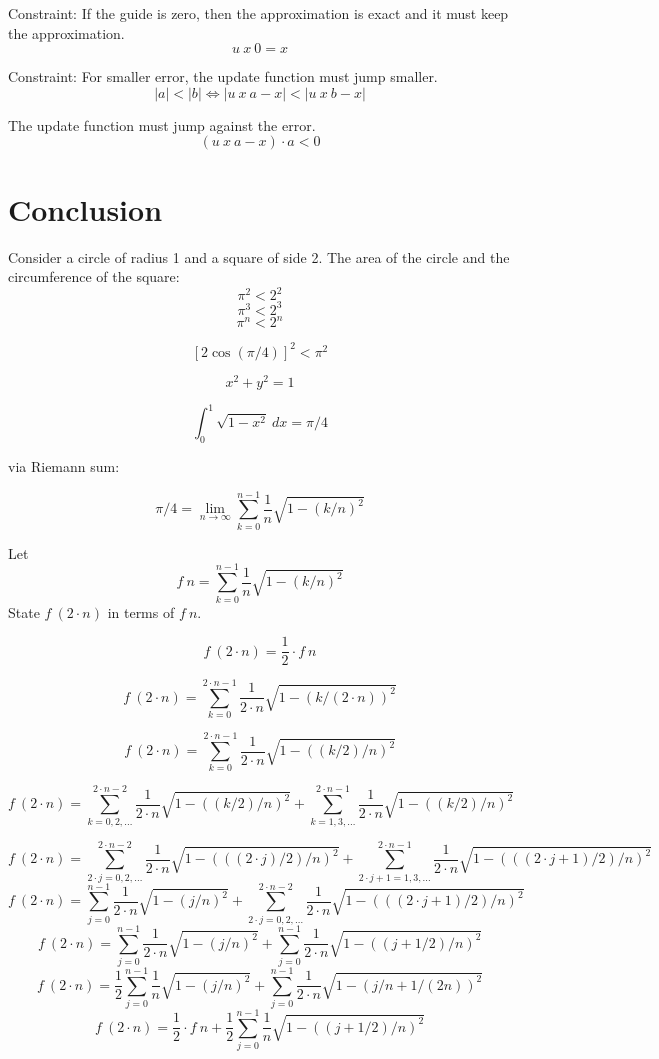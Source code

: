 Constraint: If the guide is zero, then the approximation is exact
and it must keep the approximation.
\[
    u~x~0 = x
\]

Constraint: For smaller error, the update function must jump smaller.
\[
    |a| < |b| \iff |u~x~a - x| < |u~x~b - x|
\]

The update function must jump against the error.
\[
    (u~x~a - x) \cdot a < 0
\]

\section{Conclusion}

Consider a circle of radius 1 and a square of side 2.
The area of the circle and the circumference of the square:
\[
    \pi^2 < 2^2
\]
\[
    \pi^3 < 2^3
\]
\[
    \pi^n < 2^n
\]

\[
    [2 \cos (\pi/4)]^2 < \pi^2
\]

\[
    x^2 + y^2 = 1
\]

\[
    \int_0^1 \sqrt{1-x^2}~dx = \pi / 4
\]

via Riemann sum:

\[
    \pi/4 = \lim_{n\to\infty} \sum_{k=0}^{n-1} \frac{1}{n} \sqrt{1 - (k/n)^2}
\]

Let
\[
    f~n = \sum_{k=0}^{n-1} \frac{1}{n} \sqrt{1 - (k/n)^2}
\]
State \(f~(2 \cdot n)\) in terms of \(f~n\).

\[
    f~(2 \cdot n) = \frac{1}{2} \cdot f~n
\]

\[
    f~(2 \cdot n) = \sum_{k=0}^{2 \cdot n - 1} \frac{1}{2 \cdot n} \sqrt{1 - (k/(2 \cdot n))^2}
\]

\[
    f~(2 \cdot n) = \sum_{k=0}^{2 \cdot n - 1} \frac{1}{2 \cdot n} \sqrt{1 - ((k/2)/n)^2}
\]

\[
    f~(2 \cdot n) =
    \sum_{k=0,2,\ldots}^{2 \cdot n - 2} \frac{1}{2 \cdot n} \sqrt{1 - ((k/2)/n)^2}
    + \sum_{k=1,3,\ldots}^{2 \cdot n - 1} \frac{1}{2 \cdot n} \sqrt{1 - ((k/2)/n)^2}
\]

\[
    f~(2 \cdot n) =
    \sum_{2 \cdot j=0,2,\ldots}^{2 \cdot n - 2} \frac{1}{2 \cdot n} \sqrt{1 - (((2 \cdot j)/2)/n)^2}
    + \sum_{2 \cdot j + 1=1,3,\ldots}^{2 \cdot n - 1} \frac{1}{2 \cdot n} \sqrt{1 - (((2 \cdot j + 1)/2)/n)^2}
\]
\[
    f~(2 \cdot n) =
    \sum_{j=0}^{n - 1} \frac{1}{2 \cdot n} \sqrt{1 - (j/n)^2}
    + \sum_{2 \cdot j=0,2,\ldots}^{2 \cdot n - 2} \frac{1}{2 \cdot n} \sqrt{1 - (((2 \cdot j + 1)/2)/n)^2}
\]
\[
    f~(2 \cdot n) =
    \sum_{j=0}^{n - 1} \frac{1}{2 \cdot n} \sqrt{1 - (j/n)^2}
    + \sum_{j=0}^{n-1} \frac{1}{2 \cdot n} \sqrt{1 - ((j+1/2)/n)^2}
\]
\[
    f~(2 \cdot n) =
    \frac{1}{2} \sum_{j=0}^{n - 1} \frac{1}{n} \sqrt{1 - (j/n)^2}
    + \sum_{j=0}^{n-1} \frac{1}{2 \cdot n} \sqrt{1 - (j/n + 1/(2n))^2}
\]
\[
    f~(2 \cdot n) =
    \frac{1}{2} \cdot f~n
    + \frac{1}{2} \sum_{j=0}^{n-1} \frac{1}{n} \sqrt{1 - ((j+1/2)/n)^2}
\]

